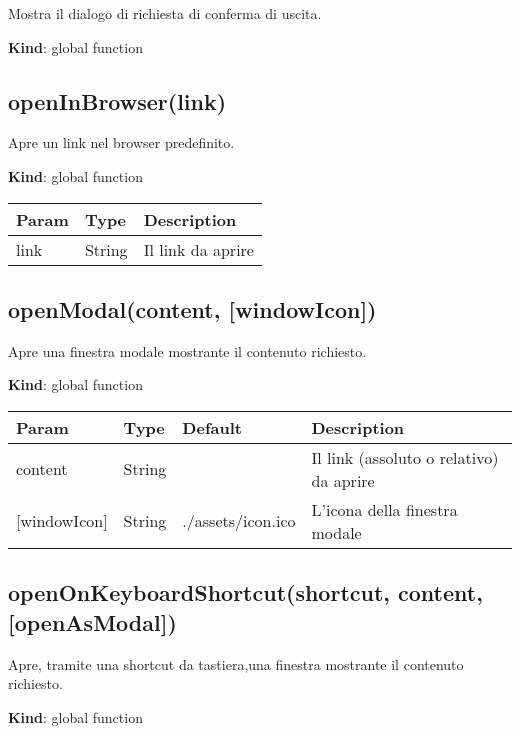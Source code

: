 Mostra il dialogo di richiesta di conferma di uscita.

\textbf{Kind}: global function\\

\hypertarget{openinbrowserlink-1}{%
\subsection{openInBrowser(link)}\label{openinbrowserlink-1}}

Apre un link nel browser predefinito.

\textbf{Kind}: global function

\begin{longtable}[]{@{}lll@{}}
\toprule
Param & Type & Description\tabularnewline
\midrule
\endhead
link & String & Il link da aprire\tabularnewline
\bottomrule
\end{longtable}

\hypertarget{openmodalcontent-windowicon-1}{%
\subsection{openModal(content,
{[}windowIcon{]})}\label{openmodalcontent-windowicon-1}}

Apre una finestra modale mostrante il contenuto richiesto.

\textbf{Kind}: global function

\begin{longtable}[]{@{}llll@{}}
\toprule
Param & Type & Default & Description\tabularnewline
\midrule
\endhead
content & String & & Il link (assoluto o relativo) da
aprire\tabularnewline
{[}windowIcon{]} & String & ./assets/icon.ico & L'icona della finestra
modale\tabularnewline
\bottomrule
\end{longtable}

\hypertarget{openonkeyboardshortcutshortcut-content-openasmodal-1}{%
\subsection{openOnKeyboardShortcut(shortcut, content,
{[}openAsModal{]})}\label{openonkeyboardshortcutshortcut-content-openasmodal-1}}

Apre, tramite una shortcut da tastiera,una finestra mostrante il
contenuto richiesto.

\textbf{Kind}: global function

